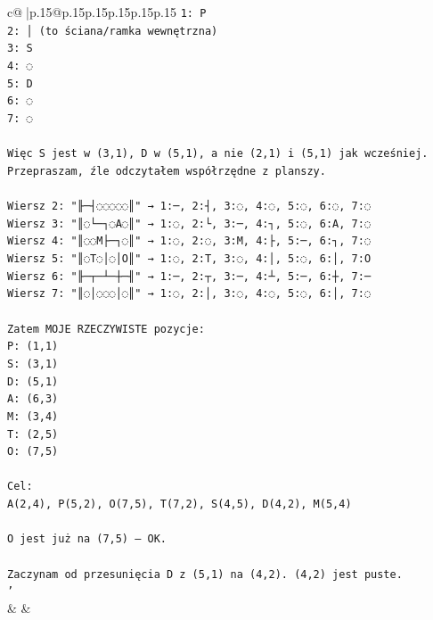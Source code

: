 \documentclass{article}
\begin{document}
{\begin{supertabular}{c@{$\;$}|p{.15\linewidth}@{}p{.15\linewidth}p{.15\linewidth}p{.15\linewidth}p{.15\linewidth}p{.15\linewidth}}
{{{\texttt{1: P} \\
\texttt{2: │ (to ściana/ramka wewnętrzna)} \\
\texttt{3: S} \\
\texttt{4: ◌} \\
\texttt{5: D} \\
\texttt{6: ◌} \\
\texttt{7: ◌} \\
\\ 
\texttt{Więc S jest w (3,1), D w (5,1), a nie (2,1) i (5,1) jak wcześniej. Przepraszam, źle odczytałem współrzędne z planszy.} \\
\\ 
\texttt{Wiersz 2: "╟─┤◌◌◌◌◌║" → 1:─, 2:┤, 3:◌, 4:◌, 5:◌, 6:◌, 7:◌} \\
\texttt{Wiersz 3: "║◌└─┐◌A◌║" → 1:◌, 2:└, 3:─, 4:┐, 5:◌, 6:A, 7:◌} \\
\texttt{Wiersz 4: "║◌◌M├─┐◌║" → 1:◌, 2:◌, 3:M, 4:├, 5:─, 6:┐, 7:◌} \\
\texttt{Wiersz 5: "║◌T◌│◌│O║" → 1:◌, 2:T, 3:◌, 4:│, 5:◌, 6:│, 7:O} \\
\texttt{Wiersz 6: "╟─┬─┴─┼─╢" → 1:─, 2:┬, 3:─, 4:┴, 5:─, 6:┼, 7:─} \\
\texttt{Wiersz 7: "║◌│◌◌◌│◌║" → 1:◌, 2:│, 3:◌, 4:◌, 5:◌, 6:│, 7:◌} \\
\\ 
\texttt{Zatem MOJE RZECZYWISTE pozycje:} \\
\texttt{P: (1,1)} \\
\texttt{S: (3,1)} \\
\texttt{D: (5,1)} \\
\texttt{A: (6,3)} \\
\texttt{M: (3,4)} \\
\texttt{T: (2,5)} \\
\texttt{O: (7,5)} \\
\\ 
\texttt{Cel:} \\
\texttt{A(2,4), P(5,2), O(7,5), T(7,2), S(4,5), D(4,2), M(5,4)} \\
\\ 
\texttt{O jest już na (7,5) – OK.} \\
\\ 
\texttt{Zaczynam od przesunięcia D z (5,1) na (4,2). (4,2) jest puste.} \\
\texttt{'} \\
            }
        }
    }
    & & \\ \\


\end{supertabular}}
\end{document}
